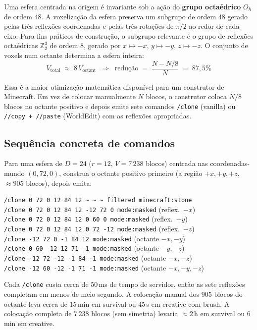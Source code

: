 \documentclass[12pt,a4paper]{scrartcl}
\newcommand{\acc}[1]{\textcolor{accent}{\textbf{#1}}}
\newcommand{\cmd}[1]{\textcolor{earth}{\texttt{\small #1}}}
\begin{document}
Uma esfera centrada na origem é invariante sob a ação do \acc{grupo octaédrico} $O_h$ de ordem $48$. A voxelização da esfera preserva um subgrupo de ordem $48$ gerado pelas três reflexões coordenadas e pelas três rotações de $\pi/2$ ao redor de cada eixo. Para fins práticos de construção, o subgrupo relevante é o grupo de reflexões octaédricas $\mathbb{Z}_2^3$ de ordem $8$, gerado por $x \mapsto -x$, $y \mapsto -y$, $z \mapsto -z$. O conjunto de voxels num octante determina a esfera inteira:
\[
V_{\mathrm{total}} \;\approx\; 8\,V_{\mathrm{octant}}\;\;\Longrightarrow\;\;
\text{redução}\;=\;\frac{N - N/8}{N} \;=\; 87{,}5\%
\]

Essa é a maior otimização matemática disponível para um construtor de Minecraft. Em vez de colocar manualmente $N$ blocos, o construtor coloca $N/8$ blocos no octante positivo e depois emite sete comandos \cmd{/clone} (vanilla) ou \cmd{//copy + //paste} (WorldEdit) com as reflexões apropriadas.

\subsection{Sequência concreta de comandos}
Para uma esfera de $D=24$ ($r=12$, $V = 7\,238$ blocos) centrada nas coordenadas-mundo $(0,72,0)$, construa o octante positivo primeiro (a região $+x, +y, +z$, $\approx 905$ blocos), depois emita:

\begin{minec}
\cmd{/clone 0 72 0 12 84 12 \textasciitilde\,\textasciitilde\,\textasciitilde\ filtered minecraft:stone}\\
\cmd{/clone 0 72 0 12 84 12 -12 72 0 mode:masked} \quad (reflex.\ \(-x\))\\
\cmd{/clone 0 72 0 12 84 12 0 60 0 mode:masked} \quad\quad (reflex.\ \(-y\))\\
\cmd{/clone 0 72 0 12 84 12 0 72 -12 mode:masked} \quad (reflex.\ \(-z\))\\
\cmd{/clone -12 72 0 -1 84 12 mode:masked} \quad\quad\quad\;\; (octante \(-x,-y\))\\
\cmd{/clone 0 60 -12 12 71 -1 mode:masked} \quad\quad\quad (octante \(-y,-z\))\\
\cmd{/clone -12 72 -12 -1 84 -1 mode:masked} \quad\;\; (octante \(-x,-z\))\\
\cmd{/clone -12 60 -12 -1 71 -1 mode:masked} \quad\;\; (octante \(-x,-y,-z\))
\end{minec}

Cada \cmd{/clone} custa cerca de $50$\,ms de tempo de servidor, então as sete reflexões completam em menos de meio segundo. A colocação manual dos $905$ blocos do octante leva cerca de $15$\,min em survival ou $45$\,s em creative com brush. A colocação completa de $7\,238$ blocos (sem simetria) levaria $\approx 2$\,h em survival ou $6$\,min em creative.
\end{document}
